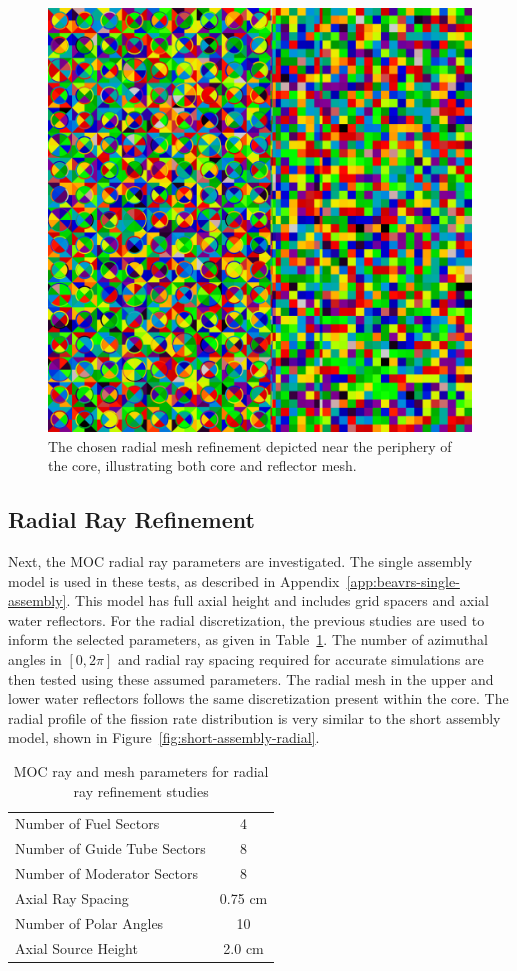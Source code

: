 \begin{figure}[h!]
	\centering
	\includegraphics[width=0.7\linewidth]{figures/moc-mesh-combined.png}
	\caption[]{The chosen radial mesh refinement depicted near the periphery of the core, illustrating both core and reflector mesh.}
	\label{fig:moc-mesh-combined}
\end{figure}

\newpage
\subsection{Radial Ray Refinement}

Next, the \ac{MOC} radial ray parameters are investigated. The single assembly model is used in these tests, as described in Appendix~\ref{app:beavrs-single-assembly}. This model has full axial height and includes grid spacers and axial water reflectors. For the radial discretization, the previous studies are used to inform the selected parameters, as given in Table~\ref{tab:rad-ray-ref-params}. The number of azimuthal angles in $[0, 2\pi]$ and radial ray spacing required for accurate simulations are then tested using these assumed parameters. The radial mesh in the upper and lower water reflectors follows the same discretization present within the core. The radial profile of the fission rate distribution is very similar to the short assembly model, shown in Figure~\ref{fig:short-assembly-radial}.

\begin{table}[ht]
	\centering
	\caption{MOC ray and mesh parameters for radial ray refinement studies}
	\medskip
	\begin{tabular}{lc}
		\hline
		Number of Fuel Sectors & 4 \\
		Number of Guide Tube Sectors & 8 \\
		Number of Moderator Sectors & 8 \\
		Axial Ray Spacing & 0.75 cm \\
		Number of Polar Angles & 10 \\
		Axial Source Height & 2.0 cm \\
		\hline
	\end{tabular}
	\label{tab:rad-ray-ref-params}
\end{table}

